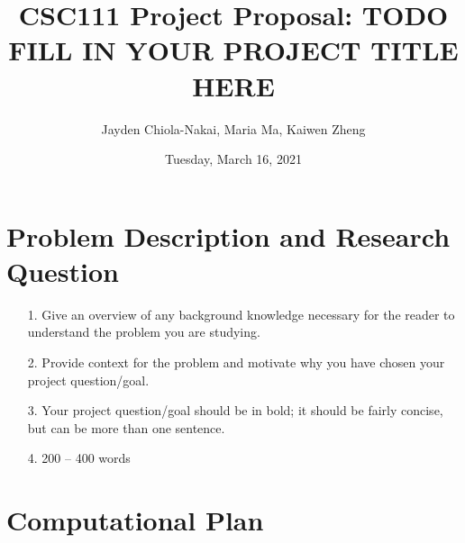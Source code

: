 \documentclass[fontsize=11pt]{article}
\title{CSC111 Project Proposal: TODO FILL IN YOUR PROJECT TITLE HERE}
\author{Jayden Chiola-Nakai, Maria Ma, Kaiwen Zheng}
\date{Tuesday, March 16, 2021}
\begin{document}
\maketitle

\section*{Problem Description and Research Question}

\begin{enumerate}
    \item[1.]
    Give an overview of any background knowledge necessary for the reader to understand the problem you are studying.
    \item[2.]
    Provide context for the problem and motivate why you have chosen your project question/goal.
    \item[3.]
    Your project question/goal should be in bold; it should be fairly concise, but can be more than one sentence.
    \item[4.]
    200 – 400 words
\end{enumerate}

\section*{Computational Plan}
\end{document}
